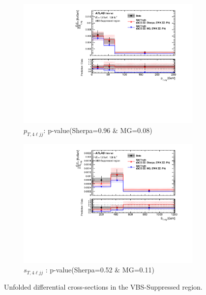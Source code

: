\begin{figure}[!htb]
\begin{subfigure}{.49\textwidth}
        \includegraphics[width=.98\linewidth]{figures/Results/CrossSection_VBSSuppressed/xs_ptzzjj_CR.pdf}
        \caption{ \footnotesize{$p_{T,4\ell jj}$}: p-value(Sherpa=0.96 $\&$ MG=0.08)}
    \end{subfigure}
    \begin{subfigure}{.49\textwidth}
        \centering
        \includegraphics[width=.98\linewidth]{figures/Results/CrossSection_VBSSuppressed/xs_stzzjj_CR.pdf}
        \caption{ \footnotesize{$s_{T, 4\ell jj}$ }: p-value(Sherpa=0.52 $\&$ MG=0.11)}
    \end{subfigure}
    \caption{Unfolded differential cross-sections in the VBS-Suppressed region.}  \label{fig:unfolded_xs_VBS_Suppressed_a}
\end{figure}

